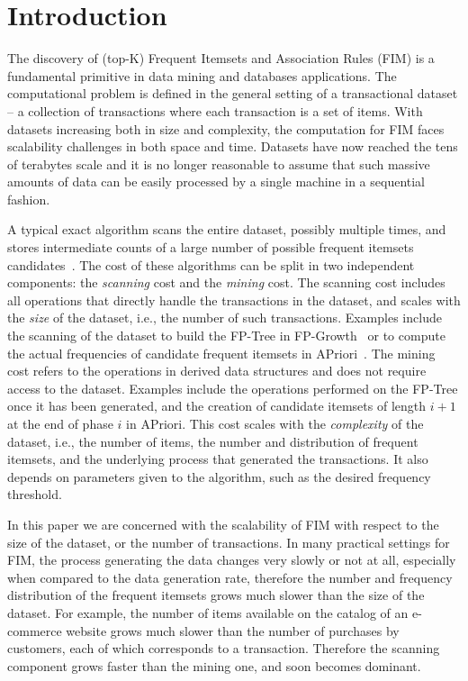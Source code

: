 \section{Introduction}\label{sec:intro}
The discovery of (top-K) Frequent Itemsets and Association Rules (FIM)
is a fundamental primitive in data mining and databases applications. The
computational problem is defined in the general setting of a transactional dataset
-- a collection of transactions where each transaction is a set of items.
With datasets increasing both in size and complexity, the computation
for FIM faces scalability challenges in both space and time. 
%
Datasets have
now reached the tens of terabytes scale and it is no longer reasonable to assume
that such massive amounts of data can be easily processed by a single machine
in a sequential fashion. 
%

A typical exact algorithm scans the entire dataset,
possibly multiple times, and stores intermediate counts of a large number of
possible frequent itemsets candidates~\cite{AgrawalS94,HanPY00}. 
%
The cost of these algorithms can be split in two independent components:
the \emph{scanning} cost and the \emph{mining} cost. The scanning cost includes
all operations that directly handle the transactions in the dataset, and scales
with the \emph{size} of the dataset, i.e., the number of such transactions. Examples
include the scanning of the dataset to build the FP-Tree in
FP-Growth~\cite{HanPY00} or to compute the actual frequencies of candidate
frequent itemsets in APriori~\cite{AgrawalIS93}.  The mining cost refers to the
operations in derived data structures and does not require access to the
dataset. Examples include the operations performed on the FP-Tree once it has
been generated, and the creation of candidate itemsets of length $i+1$ at the
end of phase $i$ in APriori.  This cost scales with the \emph{complexity} of the
dataset, i.e., the number of items, the number and distribution of frequent
itemsets, and the underlying process that generated the transactions. It also
depends on parameters given to the algorithm, such as the desired frequency
threshold.

In this paper we are concerned with the scalability of FIM with respect to
the size of the dataset, or the number of transactions. 
In many practical settings for FIM, the process generating the data changes very
slowly or not at all, especially when compared to the data generation rate,
therefore the number and frequency distribution of the frequent itemsets grows
much slower than the size of the dataset. For example, the number of items
available on the catalog of an e-commerce website grows much slower than the
number of purchases by customers, each of which corresponds to a transaction.
Therefore the scanning component grows faster than the mining one, and soon
becomes dominant. 

